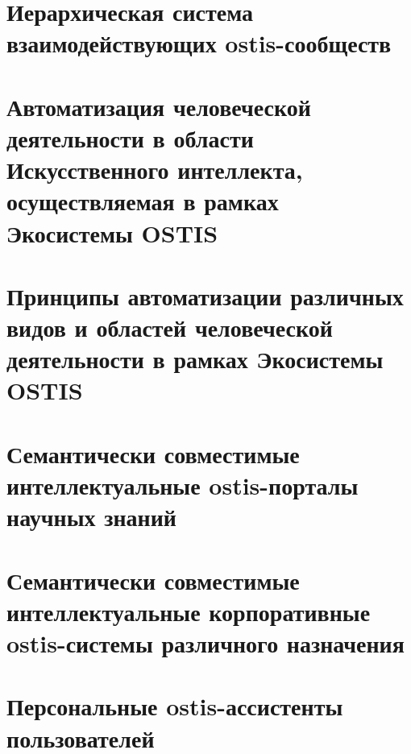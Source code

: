 \section{Иерархическая система взаимодействующих ostis-сообществ}
{\label{sec_ecosystem_structure}} 


\section{Автоматизация человеческой деятельности в области Искусственного интеллекта, осуществляемая в рамках Экосистемы OSTIS}
{\label{sec_human_activity_automation}} 


\section{Принципы автоматизации различных видов и областей человеческой деятельности в рамках Экосистемы OSTIS}
{\label{sec_ecosystem_automation_principles}} 


\section{Семантически совместимые интеллектуальные ostis-порталы научных знаний}
{\label{sec_ostis_scientific_portal}} 


\section{Семантически совместимые интеллектуальные корпоративные ostis-системы различного назначения}
{\label{sec_corporate_ostis_system}} 


\section{Персональные ostis-ассистенты пользователей}
{\label{sec_ostis_assistant}} 


%